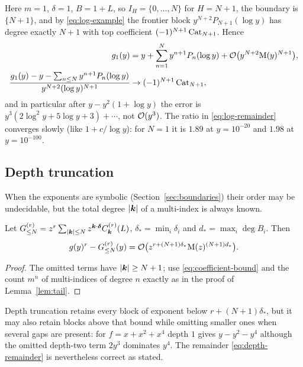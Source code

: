 \begin{example}
Here $m=1$, $\delta=1$, $B=1+L$, so $I_H=\{0,\dots,N\}$ for $H=N+1$, the boundary is $\{N+1\}$, and by \eqref{eq:log-example} the frontier block $y^{N+2}P_{N+1}(\log y)$ has degree exactly $N+1$ with top coefficient $(-1)^{N+1}\operatorname{Cat}_{N+1}$. Hence
\begin{equation}
\begin{aligned}
 g_1(y)&=y+\sum_{n=1}^Ny^{n+1}P_n(\log y)+\mathcal O\bigl(y^{N+2}\mathrm M(y)^{N+1}\bigr),\\
 \frac{g_1(y)-y-\sum_{n\le N}y^{n+1}P_n(\log y)}{y^{N+2}(\log y)^{N+1}}&\to(-1)^{N+1}\operatorname{Cat}_{N+1},
\end{aligned}
 \label{eq:log-remainder}
\end{equation}
and in particular after $y-y^2(1+\log y)$ the error is $y^3(2\log^2y+5\log y+3)+\cdots$, not $\mathcal O(y^3)$. The ratio in \eqref{eq:log-remainder} converges slowly (like $1+c/\log y$): for $N=1$ it is $1.89$ at $y=10^{-20}$ and $1.98$ at $y=10^{-100}$.
\end{example}

\subsection{Depth truncation}

When the exponents are symbolic (Section~\ref{sec:boundaries}) their order may be undecidable, but the total degree $|\boldsymbol k|$ of a multi-index is always known.

\begin{theorem}
\label{thm:depth}
Let $G^{(r)}_{\le N}=z^r\sum_{|\boldsymbol k|\le N}z^{\boldsymbol k\cdot\boldsymbol\delta}C^{(r)}_{\boldsymbol k}(L)$, $\delta_*=\min_i\delta_i$ and $d_*=\max_i\deg B_i$. Then
\begin{equation}
 g(y)^r-G^{(r)}_{\le N}(y)=\mathcal O\bigl(z^{r+(N+1)\delta_*}\mathrm M(z)^{(N+1)d_*}\bigr).
 \label{eq:depth-remainder}
\end{equation}
\end{theorem}
\begin{proof}
The omitted terms have $|\boldsymbol k|\ge N+1$; use \eqref{eq:coefficient-bound} and the count $m^n$ of multi-indices of degree $n$ exactly as in the proof of Lemma~\ref{lem:tail}.
\end{proof}

Depth truncation retains every block of exponent below $r+(N+1)\delta_*$, but it may also retain blocks above that bound while omitting smaller ones when several gaps are present: for $f=x+x^2+x^4$ depth $1$ gives $y-y^2-y^4$ although the omitted depth-two term $2y^3$ dominates $y^4$. The remainder \eqref{eq:depth-remainder} is nevertheless correct as stated.
